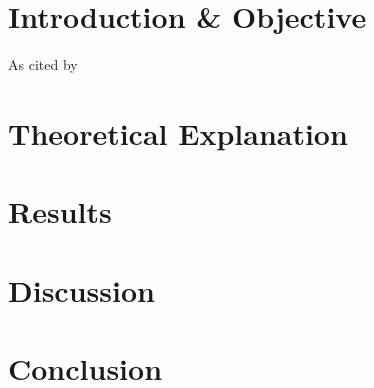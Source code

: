 \documentclass{article}
\begin{document}

\newpage
\tableofcontents
\newpage

\section{Introduction \& Objective}
As cited by \cite{10.5555/519085}
\section{Theoretical Explanation}
\section{Results}
\section{Discussion}
\section{Conclusion}

\renewcommand{\bibname}{References}

\end{document}
